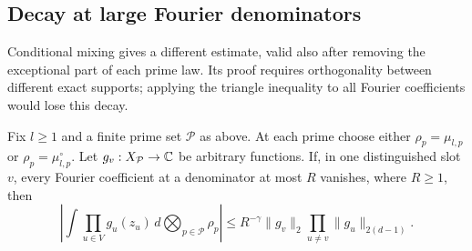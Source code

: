 \subsection{Decay at large Fourier denominators}

Conditional mixing gives a different estimate, valid also after
removing the exceptional part of each prime law.  Its proof requires
orthogonality between different exact supports; applying the triangle
inequality to all Fourier coefficients would lose this decay.

\begin{lemma}
\label{lift:large-denominator}
Fix \(l\ge1\) and a finite prime set \(\mathcal P\) as above.  At
each prime choose either \(\rho_p=\mu_{l,p}\) or
\(\rho_p=\mu_{l,p}^{\circ}\).  Let \(g_v:X_{\mathcal P}\to\mathbb C\)
be arbitrary functions.  If, in one distinguished slot \(v\), every
Fourier coefficient at a denominator at most \(R\) vanishes, where
\(R\ge1\), then
\begin{equation}
 \left|\int\prod_{u\in V}g_u(z_u)\,
                  d\bigotimes_{p\in\mathcal P}\rho_p\right|
 \le R^{-\gamma}\|g_v\|_2
                     \prod_{u\ne v}\|g_u\|_{2(d-1)}.
 \label{eq:11}
\end{equation}
\end{lemma}


